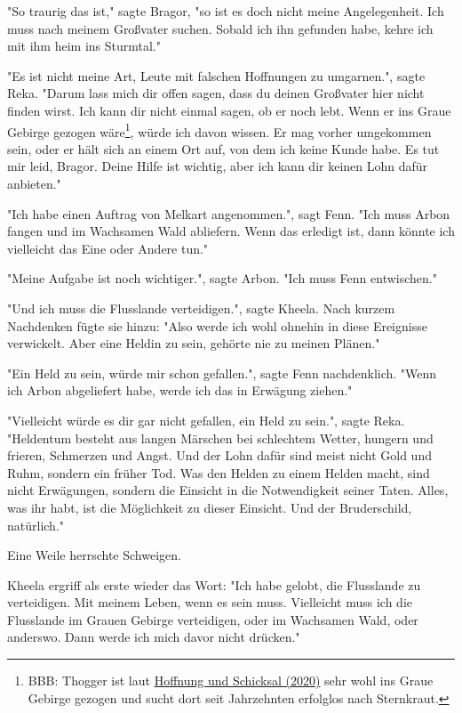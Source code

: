 \documentclass[10pt, a4paper, oneside]{book}
\newcommand{\refstorytext}[1]{\hyperref[Storytext: #1]{#1}}
\begin{document}
\begin{multicols}{2}
"So traurig das ist," sagte Bragor, "so ist es doch nicht meine Angelegenheit. Ich muss nach meinem Großvater suchen. Sobald ich ihn gefunden habe, kehre ich mit ihm heim ins Sturmtal." 

"Es ist nicht meine Art, Leute mit falschen Hoffnungen zu umgarnen.", sagte Reka. "Darum lass mich dir offen sagen, dass du deinen Großvater hier nicht finden wirst. Ich kann dir nicht einmal sagen, ob er noch lebt. Wenn er ins Graue Gebirge gezogen wäre\footnote{BBB: Thogger ist laut \refstorytext{Hoffnung und Schicksal (2020)} sehr wohl ins Graue Gebirge gezogen und sucht dort seit Jahrzehnten erfolglos nach Sternkraut.}, würde ich davon wissen. Er mag vorher umgekommen sein, oder er hält sich an einem Ort auf, von dem ich keine Kunde habe. Es tut mir leid, Bragor. Deine Hilfe ist wichtig, aber ich kann dir keinen Lohn dafür anbieten." 

"Ich habe einen Auftrag von Melkart angenommen.", sagt Fenn. "Ich muss Arbon fangen und im Wachsamen Wald abliefern. Wenn das erledigt ist, dann könnte ich vielleicht das Eine oder Andere tun." 

"Meine Aufgabe ist noch wichtiger.", sagte Arbon. "Ich muss Fenn entwischen." 

"Und ich muss die Flusslande verteidigen.", sagte Kheela. Nach kurzem Nachdenken fügte sie hinzu: "Also werde ich wohl ohnehin in diese Ereignisse verwickelt. Aber eine Heldin zu sein, gehörte nie zu meinen Plänen." 

"Ein Held zu sein, würde mir schon gefallen.", sagte Fenn nachdenklich. "Wenn ich Arbon abgeliefert habe, werde ich das in Erwägung ziehen." 

"Vielleicht würde es dir gar nicht gefallen, ein Held zu sein.", sagte Reka. "Heldentum besteht aus langen Märschen bei schlechtem Wetter, hungern und frieren, Schmerzen und Angst. Und der Lohn dafür sind meist nicht Gold und Ruhm, sondern ein früher Tod. Was den Helden zu einem Helden macht, sind nicht Erwägungen, sondern die Einsicht in die Notwendigkeit seiner Taten. Alles, was ihr habt, ist die Möglichkeit zu dieser Einsicht. Und der Bruderschild, natürlich." 

Eine Weile herrschte Schweigen. 

Kheela ergriff als erste wieder das Wort: "Ich habe gelobt, die Flusslande zu verteidigen. Mit meinem Leben, wenn es sein muss. Vielleicht muss ich die Flusslande im Grauen Gebirge verteidigen, oder im Wachsamen Wald, oder anderswo. Dann werde ich mich davor nicht drücken." 


\end{multicols}
\end{document}
